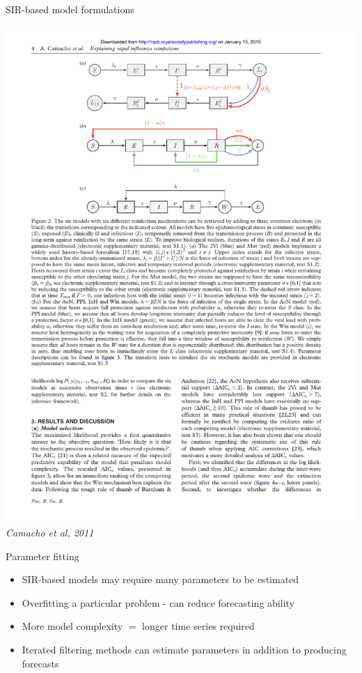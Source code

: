 \documentclass[10pt]{beamer}
\begin{document}
\begin{frame}[allowframebreaks]{SIR-based model formulations}
			\framebreak
			\begin{center}
				\includegraphics[width=\textwidth,height=0.75\textheight,keepaspectratio=true]{images/seir_variations.pdf}
				\\
				{\it \small Camacho et al, 2011}
			\end{center}

		\end{frame}

		\begin{frame}{Parameter fitting}
			\begin{itemize}
				\item SIR-based models may require many parameters to be estimated
				\item Overfitting a particular problem - can reduce forecasting ability
				\item More model complexity $=$ longer time series required
				\item Iterated filtering methods can estimate parameters in addition to producing forecasts
			\end{itemize}
		\end{frame}
\end{document}
